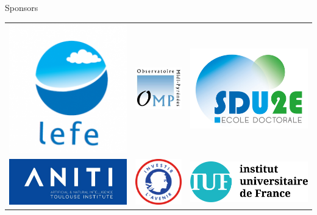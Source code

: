 \documentclass[pressentation,10pt,aspectratio=1610, xcolor=table]{beamer}
\begin{document}
\begin{frame}[label={sec:org04ac605}]{Sponsors}
\begin{center}
  \begin{tabular}{ccc}
    \includegraphics[width=0.2\linewidth]{pictures/lefe_manu.png} & \includegraphics[width=0.2\linewidth]{pictures/logoomp_large.jpg} &                                                                                                                          \includegraphics[width=0.22\linewidth]{pictures/logosdu2e300dpi.jpg}\\
        \includegraphics[width=0.2\linewidth]{pictures/logo_aniti.jpg} &     \includegraphics[width=0.2\linewidth]{pictures/logo_avenir.png}     &     \includegraphics[width=0.3\linewidth]{pictures/IUF_logotype_fond-transparent_off.png}
  \end{tabular}
\end{center}
\end{frame}
\end{document}

